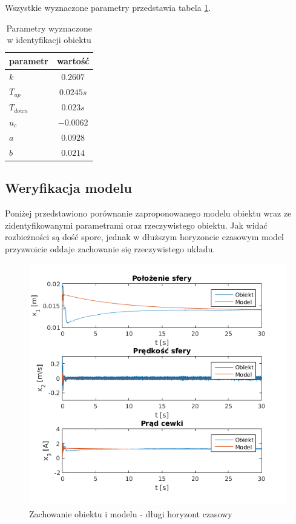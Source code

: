 Wszystkie wyznaczone parametry przedstawia tabela \ref{tab:parametry_ident}.

\begin{table}[H]
\begin{center}
  \begin{tabular}{| l | c | }
    \hline
    parametr 	& wartość \\ \hline
    $k$ & $0.2607$ \\ \hline
    $T_{up}$ & $0.0245 s$  \\ \hline
	$T_{down}$ & $0.023 s$  \\ \hline
	$u_c$ & $-0.0062 $ 	 \\ \hline
    $a$ 		  	& $0.0928$ \\ \hline
    $b$		  	& $0.0214$ \\ \hline
  \end{tabular}
  \caption{Parametry wyznaczone w identyfikacji obiektu}
  \label{tab:parametry_ident}
\end{center}
\end{table}

\subsection{Weryfikacja modelu}

Poniżej przedstawiono porównanie zaproponowanego modelu obiektu wraz ze zidentyfikowanymi parametrami oraz rzeczywistego obiektu. Jak widać rozbieżności są dość spore, jednak w dłuższym horyzoncie czasowym model przyzwoicie oddaje zachowanie się rzeczywistego układu.

\begin{figure}[H]
\centering
\includegraphics[scale=0.75]{img/zgodnosc_1.png}
\caption{Zachowanie obiektu i modelu - długi horyzont czasowy}
\label{rys:pochodna_od_polozenia}
\end{figure}


